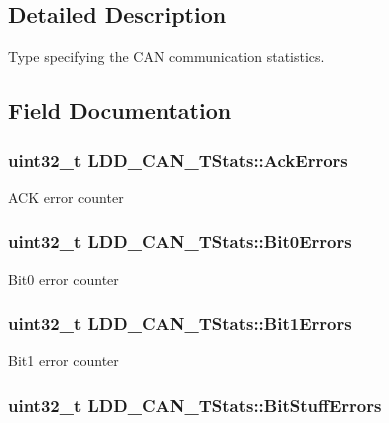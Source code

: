 \subsection{Detailed Description}
Type specifying the C\-A\-N communication statistics. 

\subsection{Field Documentation}
\hypertarget{struct_l_d_d___c_a_n___t_stats_aa2f78bb4fe62158e98a24389bf5c9d3f}{
\subsubsection[{Ack\-Errors}]{\setlength{\rightskip}{0pt plus 5cm}uint32\-\_\-t L\-D\-D\-\_\-\-C\-A\-N\-\_\-\-T\-Stats\-::\-Ack\-Errors}}\label{struct_l_d_d___c_a_n___t_stats_aa2f78bb4fe62158e98a24389bf5c9d3f}
A\-C\-K error counter \hypertarget{struct_l_d_d___c_a_n___t_stats_a5b1d814077cb713499d7a95e91719552}{
\subsubsection[{Bit0\-Errors}]{\setlength{\rightskip}{0pt plus 5cm}uint32\-\_\-t L\-D\-D\-\_\-\-C\-A\-N\-\_\-\-T\-Stats\-::\-Bit0\-Errors}}\label{struct_l_d_d___c_a_n___t_stats_a5b1d814077cb713499d7a95e91719552}
Bit0 error counter \hypertarget{struct_l_d_d___c_a_n___t_stats_a0c580b25ec28e467601580e79e7137d4}{
\subsubsection[{Bit1\-Errors}]{\setlength{\rightskip}{0pt plus 5cm}uint32\-\_\-t L\-D\-D\-\_\-\-C\-A\-N\-\_\-\-T\-Stats\-::\-Bit1\-Errors}}\label{struct_l_d_d___c_a_n___t_stats_a0c580b25ec28e467601580e79e7137d4}
Bit1 error counter \hypertarget{struct_l_d_d___c_a_n___t_stats_a811a427adbc75325167b5073963c676a}{
\subsubsection[{Bit\-Stuff\-Errors}]{\setlength{\rightskip}{0pt plus 5cm}uint32\-\_\-t L\-D\-D\-\_\-\-C\-A\-N\-\_\-\-T\-Stats\-::\-Bit\-Stuff\-Errors}}\label{struct_l_d_d___c_a_n___t_stats_a811a427adbc75325167b5073963c676a}
